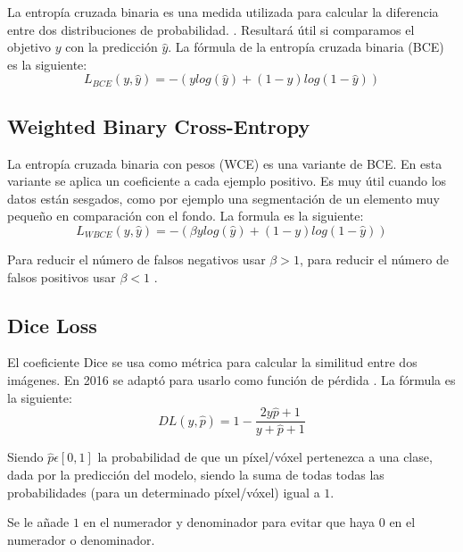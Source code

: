 La entropía cruzada binaria es una medida utilizada para calcular la diferencia entre dos distribuciones de probabilidad. \cite{Jadon2020}. Resultará útil si comparamos el objetivo $y$ con la predicción $\hat{y}$. La fórmula de la entropía cruzada binaria (BCE) es la siguiente:
\begin{equation}
L_{BCE}(y,\hat{y})=-(y log(\hat{y}) + (1-y)log(1-\hat{y}))
\end{equation}

\subsection{Weighted Binary Cross-Entropy}\label{cnn_wbce}

La entropía cruzada binaria con pesos (WCE) es una variante de BCE. En esta variante se aplica un coeficiente a cada ejemplo positivo. Es muy útil cuando los datos están sesgados, como por ejemplo una segmentación de un elemento muy pequeño en comparación con el fondo. La formula es la siguiente:
\begin{equation}
L_{WBCE}(y,\hat{y})=-(\beta y log(\hat{y}) + (1-y)log(1-\hat{y}))
\end{equation}

Para reducir el número de falsos negativos usar $\beta > 1$, para reducir el número de falsos positivos usar $\beta < 1$ \cite{Jadon2020}.

\subsection{Dice Loss}\label{cnn_dice}

El coeficiente Dice se usa como métrica para calcular la similitud entre dos imágenes. En 2016 se adaptó para usarlo como función de pérdida \cite{Cardoso2017}. La fórmula es la siguiente:
\begin{equation}
DL(y,\hat{p})= 1 - \frac{2y\hat{p}+1}{y+\hat{p}+1}
\end{equation}

Siendo $\hat{p}\epsilon[0,1]$ la probabilidad de que un píxel/vóxel pertenezca a una clase, dada por la predicción del modelo, siendo la suma de todas todas las probabilidades (para un determinado píxel/vóxel) igual a $1$.

Se le añade $1$ en el numerador y denominador para evitar que haya $0$ en el numerador o denominador.

